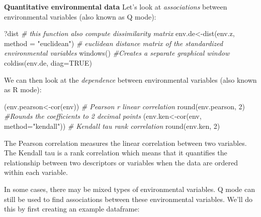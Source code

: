 \documentclass[
]{book}
\newenvironment{Shaded}{\begin{snugshade}}{\end{snugshade}}
\newcommand{\AttributeTok}[1]{\textcolor[rgb]{0.77,0.63,0.00}{#1}}
\newcommand{\CommentTok}[1]{\textcolor[rgb]{0.56,0.35,0.01}{\textit{#1}}}
\newcommand{\ConstantTok}[1]{\textcolor[rgb]{0.00,0.00,0.00}{#1}}
\newcommand{\DecValTok}[1]{\textcolor[rgb]{0.00,0.00,0.81}{#1}}
\newcommand{\FunctionTok}[1]{\textcolor[rgb]{0.00,0.00,0.00}{#1}}
\newcommand{\NormalTok}[1]{#1}
\newcommand{\OtherTok}[1]{\textcolor[rgb]{0.56,0.35,0.01}{#1}}
\newcommand{\StringTok}[1]{\textcolor[rgb]{0.31,0.60,0.02}{#1}}
\begin{document}
\textbf{Quantitative environmental data} Let's look at \emph{associations} between
environmental variables (also known as Q mode):

\begin{Shaded}
\begin{Highlighting}[]
\NormalTok{?dist }\CommentTok{\# this function also compute dissimilarity matrix}
\NormalTok{env.de}\OtherTok{\textless{}{-}}\FunctionTok{dist}\NormalTok{(env.z, }\AttributeTok{method =} \StringTok{"euclidean"}\NormalTok{) }\CommentTok{\# euclidean distance matrix of the standardized environmental variables }
\FunctionTok{windows}\NormalTok{() }\CommentTok{\#Creates a separate graphical window}
\FunctionTok{coldiss}\NormalTok{(env.de, }\AttributeTok{diag=}\ConstantTok{TRUE}\NormalTok{)}
\end{Highlighting}
\end{Shaded}

We can then look at the \emph{dependence} between environmental variables
(also known as R mode):

\begin{Shaded}
\begin{Highlighting}[]
\NormalTok{(env.pearson}\OtherTok{\textless{}{-}}\FunctionTok{cor}\NormalTok{(env)) }\CommentTok{\# Pearson r linear correlation}
\FunctionTok{round}\NormalTok{(env.pearson, }\DecValTok{2}\NormalTok{) }\CommentTok{\#Rounds the coefficients to 2 decimal points }
\NormalTok{(env.ken}\OtherTok{\textless{}{-}}\FunctionTok{cor}\NormalTok{(env, }\AttributeTok{method=}\StringTok{"kendall"}\NormalTok{)) }\CommentTok{\# Kendall tau rank correlation}
\FunctionTok{round}\NormalTok{(env.ken, }\DecValTok{2}\NormalTok{) }
\end{Highlighting}
\end{Shaded}

The Pearson correlation measures the linear correlation between two
variables. The Kendall tau is a rank correlation which means that it
quantifies the relationship between two descriptors or variables when
the data are ordered within each variable.

In some cases, there may be mixed types of environmental variables. Q
mode can still be used to find associations between these environmental
variables. We'll do this by first creating an example dataframe:
\end{document}
